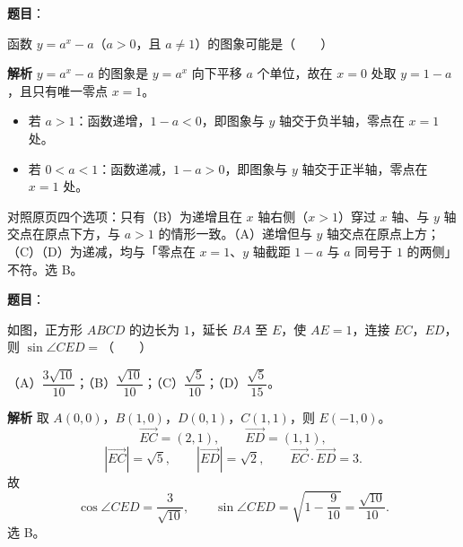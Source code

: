\begin{answer}

\textbf{题目}：

函数 $y=a^x-a$（$a>0$，且 $a\neq1$）的图象可能是\mbox{（　　）}
\nopagebreak[4]
\begin{center}\end{center}
\nopagebreak[4]
\textbf{解析}
$y=a^x-a$ 的图象是 $y=a^x$ 向下平移 $a$ 个单位，故在 $x=0$ 处取 $y=1-a$，且只有唯一零点 $x=1$。

\begin{itemize}
\item 若 $a>1$：函数递增，$1-a<0$，即图象与 $y$ 轴交于负半轴，零点在 $x=1$ 处。
\item 若 $0<a<1$：函数递减，$1-a>0$，即图象与 $y$ 轴交于正半轴，零点在 $x=1$ 处。
\end{itemize}

对照原页四个选项：只有（B）为递增且在 $x$ 轴右侧（$x>1$）穿过 $x$ 轴、与 $y$ 轴交点在原点下方，与 $a>1$ 的情形一致。（A）递增但与 $y$ 轴交点在原点上方；（C）（D）为递减，均与「零点在 $x=1$、$y$ 轴截距 $1-a$ 与 $a$ 同号于 $1$ 的两侧」不符。选 B。


\end{answer}
\begin{answer}

\textbf{题目}：

如图，正方形 $ABCD$ 的边长为 $1$，延长 $BA$ 至 $E$，使 $AE=1$，连接 $EC$，$ED$，则 $\sin\angle CED=$\mbox{（　　）}
\nopagebreak[4]
\begin{center}\end{center}
\nopagebreak[4]
（A）$\dfrac{3\sqrt{10}}{10}$；（B）$\dfrac{\sqrt{10}}{10}$；（C）$\dfrac{\sqrt5}{10}$；（D）$\dfrac{\sqrt5}{15}$。

\textbf{解析}
取 $A(0,0)$，$B(1,0)$，$D(0,1)$，$C(1,1)$，则 $E(-1,0)$。
\nopagebreak[4]
\[\overrightarrow{EC}=(2,1),\qquad \overrightarrow{ED}=(1,1),\]
\nopagebreak[4]
\[|\overrightarrow{EC}|=\sqrt5,\qquad |\overrightarrow{ED}|=\sqrt2,\qquad \overrightarrow{EC}\cdot\overrightarrow{ED}=3.\]
故
\nopagebreak[4]
\[\cos\angle CED=\frac{3}{\sqrt{10}},\qquad \sin\angle CED=\sqrt{1-\frac9{10}}=\frac{\sqrt{10}}{10}.\]
选 B。


\end{answer}
